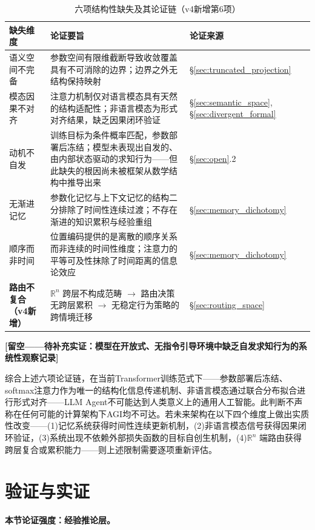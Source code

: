 \documentclass[11pt,a4paper]{article}
\theoremstyle{definition}
\begin{document}
\begin{table}[H]
\centering
\caption{六项结构性缺失及其论证链（v4新增第6项）}
\begin{tabular}{@{}p{3cm}p{5cm}p{4cm}@{}}
\toprule
\textbf{缺失维度} & \textbf{论证要旨} & \textbf{论证来源} \\
\midrule
语义空间不完备 & 参数空间有限维截断导致收敛覆盖具有不可消除的边界；边界之外无结构保持映射 & \S\ref{sec:truncated_projection} \\
模态因果不对齐 & 注意力机制仅对语言模态具有天然的结构适配性；非语言模态为形式对齐结果，缺乏因果闭环验证 & \S\ref{sec:semantic_space}, \S\ref{sec:divergent_formal} \\
动机不自发 & 训练目标为条件概率匹配，参数部署后冻结；模型未表现出自发的、由内部状态驱动的求知行为——但此缺失的根因尚未被框架从数学结构中推导出来 & \S\ref{sec:open}.2 \\
无渐进记忆 & 参数化记忆与上下文记忆的结构二分排除了时间性连续过渡；不存在渐进的知识累积与经验重组 & \S\ref{sec:memory_dichotomy} \\
顺序而非时间 & 位置编码提供的是离散的顺序关系而非连续的时间性维度；注意力的平等可及性抹除了时间距离的信息论效应 & \S\ref{sec:memory_dichotomy} \\
\textbf{路由不复合（v4新增）} & $\mathbb{R}^n$ 跨层不构成范畴 $\to$ 路由决策无跨层累积 $\to$ 无稳定行为策略的跨情境迁移 & \S\ref{sec:routing_space} \\
\bottomrule
\end{tabular}
\end{table}

\textbf{[留空——待补充实证：模型在开放式、无指令引导环境中缺乏自发求知行为的系统性观察记录]}

综合上述六项论证链，在当前Transformer训练范式下——参数部署后冻结、softmax注意力作为唯一的结构化信息传递机制、非语言模态通过联合分布拟合进行形式对齐——LLM Agent不可能达到人类意义上的通用人工智能。此判断不声称在任何可能的计算架构下AGI均不可达。若未来架构在以下四个维度上做出实质性改变——(1)记忆系统获得时间性连续更新机制，(2)非语言模态信号获得因果闭环验证，(3)系统出现不依赖外部损失函数的目标自创生机制，(4)$\mathbb{R}^n$ 端路由获得跨层复合或累积能力——则上述限制需要逐项重新评估。


\section{验证与实证}
\label{sec:empirical}

\textbf{本节论证强度：经验推论层。}
\end{document}
